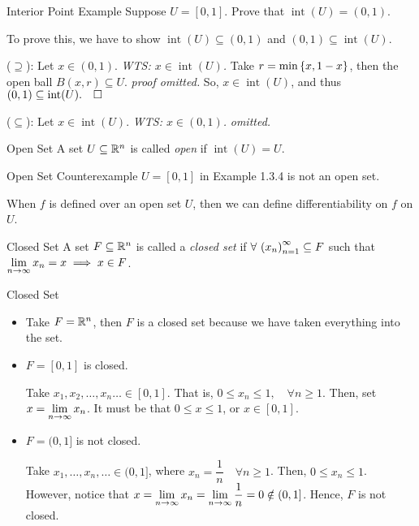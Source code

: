 \begin{eg}{Interior Point Example}
	Suppose $U=[0,1]$. Prove that $\operatorname{int}(U)=(0,1)$.
	\begin{prf}
		To prove this, we have to show $\operatorname{int}(U)\subseteq(0,1)$ and $(0,1)\subseteq\operatorname{int}(U)$.\par 
		($\supseteq$): Let $x\in(0,1)$. \textit{WTS: $x\in\operatorname{int}(U)$.} Take $r=\min\qty{x,1-x}$, then the open ball $B(x,r)\subseteq U$. \textit{proof omitted. } So, $x\in\operatorname{int}(U)$, and thus $(0,1)\subseteq\operatorname{int}(U). \quad\square$\par 
		($\subseteq$): Let $x\in\operatorname{int}(U)$. \textit{WTS: $x\in(0,1)$.} \textit{omitted.}
	\end{prf}
\end{eg}
\begin{df}{Open Set}
	A set $U\subseteq{\mathbb{R}}^n$ is called \textit{open} if $\operatorname{int}(U)=U$.	
\end{df}
\begin{eg}{Open Set Counterexample}
	$U=[0,1]$ in Example 1.3.4 is not an open set.	
\end{eg}
\begin{rmk}
	When $f$ is defined over an open set $U$, then we can define differentiability on $f$ on $U$.
\end{rmk}
\begin{df}{Closed Set}
	A set $F\subseteq{\mathbb{R}}^n$ is called a \textit{closed set} if $\forall\ \qty(x_n)_{n=1}^\infty\subseteq F$ such that $\displaystyle\lim_{n\to\infty}x_n=x\implies x\in F$.
\end{df}
\begin{eg}{Closed Set}
	\begin{itemize}
		\item Take $F={\mathbb{R}}^n$, then $F$ is a closed set because we have taken everything into the set.
		\item $F=[0,1]$ is closed.
		\begin{prf}
			Take $x_1,x_2,\dots,x_n\dots\in[0,1]$. That is, $0\leq x_n\leq1,\quad\forall n\geq1$. Then, set $x=\displaystyle\lim_{n\to\infty}x_n$. It must be that $0\leq x\leq 1$, or $x\in[0, 1]$.
		\end{prf}
		\item $F=(0,1]$ is not closed.
		\begin{prf}
			Take $x_1,\dots,x_n,\dots\in(0,1]$, where $x_n=\dfrac{1}{n}\quad\forall n\geq1$. Then, $0\leq x_n\leq1$. However, notice that $x=\displaystyle\lim_{n\to\infty}x_n=\lim_{n\to\infty}\dfrac{1}{n}=0\notin(0,1]$. Hence, $F$ is not closed. 
		\end{prf}
	\end{itemize}	
\end{eg}
